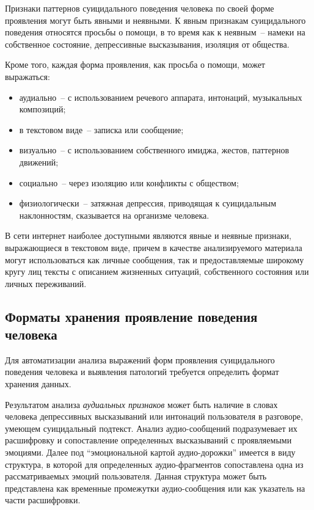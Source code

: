 Признаки паттернов суицидального поведения человека по своей форме проявления могут быть явными и неявными. К явным признакам суицидального поведения относятся просьбы о помощи, в то время как к неявным~-- намеки на собственное состояние, депрессивные высказывания, изоляция от общества.

Кроме того, каждая форма проявления, как просьба о помощи, может выражаться:

\begin{itemize}
	\item аудиально~-- с использованием речевого аппарата, интонаций, музыкальных композиций;
	\item в текстовом виде~-- записка или сообщение;
	\item визуально~-- с использованием собственного имиджа, жестов, паттернов движений;
	\item социально~-- через изоляцию или конфликты с обществом;
	\item физиологически~-- затяжная депрессия, приводящая к суицидальным наклонностям, сказывается на организме человека.
\end{itemize}

В сети интернет наиболее доступными являются явные и неявные признаки, выражающиеся в текстовом виде, причем в качестве анализируемого материала могут использоваться как личные сообщения, так и предоставляемые широкому кругу лиц тексты с описанием жизненных ситуаций, собственного состояния или личных переживаний.

\subsection{Форматы хранения проявление поведения человека}

Для автоматизации анализа выражений форм проявления суицидального поведения человека и выявления патологий требуется определить формат хранения данных.

Результатом анализа \textit{аудиальных признаков} может быть наличие в словах человека депрессивных высказываний или интонаций пользователя в разговоре, умеющем суицидальный подтекст. Анализ аудио-сообщений подразумевает их расшифровку и сопоставление определенных высказываний с проявляемыми эмоциями. Далее под ``эмоциональной картой аудио-дорожки'' имеется в виду структура, в которой для определенных аудио-фрагментов сопоставлена одна из рассматриваемых эмоций пользователя. Данная структура может быть представлена как временные промежутки аудио-сообщения или как указатель на части расшифровки. 


